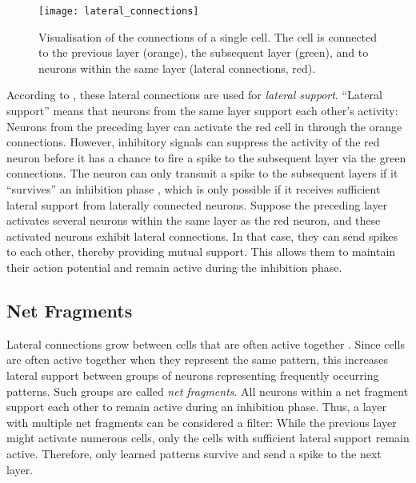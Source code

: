 \begin{figure}[h]
    \centering
    \texttt{[image: lateral\_connections]}
    \caption[Lateral connections of a cell]{Visualisation of the connections of a single cell. The cell is connected to the previous layer (orange), the subsequent layer (green), and to neurons within the same layer (lateral connections, red).}
\end{figure}

According to , these lateral connections are used for \emph{lateral support}. ``Lateral support'' means that neurons from the same layer support each other's activity:
Neurons from the preceding layer can activate the red cell in  through the orange connections.
However, inhibitory signals can suppress the activity of the red neuron before it has a chance to fire a spike to the subsequent layer via the green connections. The neuron can only transmit a spike to the subsequent layers if it ``survives'' an inhibition phase \cite{coombs_specific_1955}, which is only possible if it receives sufficient lateral support from laterally connected neurons.
Suppose the preceding layer activates several neurons within the same layer as the red neuron, and these activated neurons exhibit lateral connections. In that case, they can send spikes to each other, thereby providing mutual support. This allows them to maintain their action potential and remain active during the inhibition phase.

\subsection{Net Fragments}
Lateral connections grow between cells that are often active together .
Since cells are often active together when they represent the same pattern, this increases lateral support between groups of neurons representing frequently occurring patterns. Such groups are called \emph{net fragments}.
All neurons within a net fragment support each other to remain active during an inhibition phase. 
Thus, a layer with multiple net fragments can be considered a filter: While the previous layer might activate numerous cells, only the cells with sufficient lateral support remain active. Therefore, only learned patterns survive and send a spike to the next layer.


